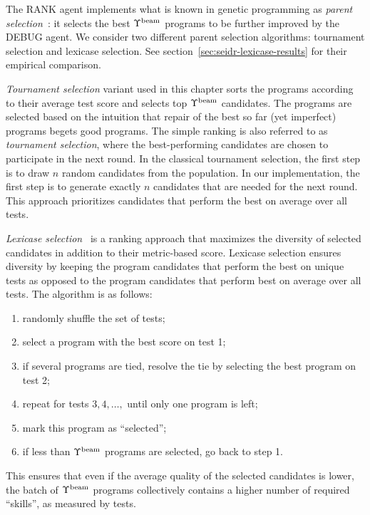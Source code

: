 The RANK agent implements what is known in genetic programming as \emph{parent selection}~\cite{koza1994:genetic}: it selects the best $\Upsilon^\text{beam}{}$ programs to be further improved by the DEBUG agent.
We consider two different parent selection algorithms: tournament selection and lexicase selection. 
See section~\ref{sec:seidr-lexicase-results} for their empirical comparison.

\emph{Tournament selection} variant used in this chapter sorts the programs according to their average test score and selects top $\Upsilon^\text{beam}{}$ candidates. 
The programs are selected based on the intuition that repair of the best so far (yet imperfect) programs begets good programs. 
The simple ranking is also referred to as \emph{tournament selection}, where the best-performing candidates are chosen to participate in the next round.  
In the classical tournament selection, the first step is to draw $n$ random candidates from the population. 
In our implementation, the first step is to generate exactly $n$ candidates that are needed for the next round. 
This approach prioritizes candidates that perform the best on average over all tests.

\emph{Lexicase selection}~\cite{helmuth2015:solving} is a ranking approach that maximizes the diversity of selected candidates in addition to their metric-based score.
Lexicase selection ensures diversity by keeping the program candidates that perform the best on unique tests as opposed to the program candidates that perform best on average over all tests.
The algorithm is as follows:
\begin{enumerate}

\setlength{\parskip}{0pt}
\setlength\itemsep{0pt}

    \item randomly shuffle the set of tests;
    \item select a program with the best score on test 1;
    \item if several programs are tied, resolve the tie by selecting the best program on test 2;
    \item repeat for tests $3,4,\dots,$ until only one program is left;
    \item mark this program as ``selected'';
    \item if less than $\Upsilon^\text{beam}$ programs are selected, go back to step 1.
\end{enumerate}
This ensures that even if the average quality of the selected candidates is lower, the batch of $\Upsilon^\text{beam}{}$ programs collectively contains a higher number of required ``skills'', as measured by tests.



